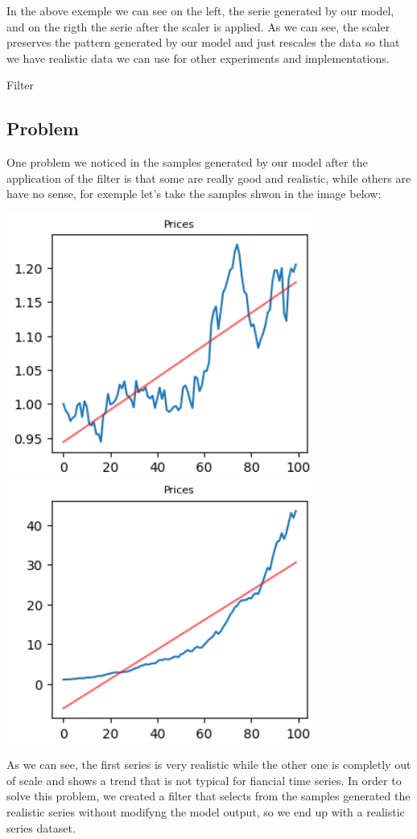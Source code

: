 \documentclass{article}
\begin{document}
    In the above exemple we can see on the left, the serie generated by our model, and on the rigth the serie after the scaler is applied. As we can see,  
    the scaler preserves the pattern generated by our model and just rescales the data so that we have realistic data we can use for other experiments and implementations.



\begin{center}
    {\huge{Filter}}
\end{center}    
    \begin{multicols}{2}
    \section*{Problem}
    One problem we noticed in the samples generated by our model after the application of the filter is that some are really good and realistic, while others are 
    have no sense, for exemple let's take the samples shwon in the image below:
    \begin{center}
        \includegraphics[scale=0.49]{imgs/riccardo/serie_comp_1.png}
        \includegraphics[scale=0.49]{imgs/riccardo/serie_comp_2.png}
    \end{center}
    As we can see, the first series is very realistic while the other one is completly out of scale and shows a trend that is not 
    typical for fiancial time series. In order to solve this problem, we created a filter that selects from the samples generated the realistic series without modifyng the model output, so we end up with a realistic series dataset.

\end{multicols}
\end{document}
